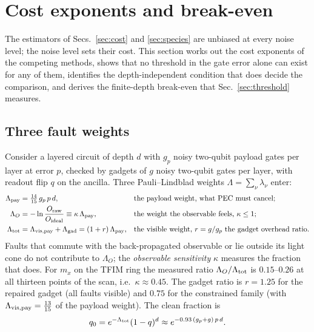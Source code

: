 \documentclass[11pt,a4paper]{article}
\theoremstyle{remark}
\begin{document}
\section{Cost exponents and break-even}
\label{sec:breakeven}

The estimators of Secs.~\ref{sec:cost} and \ref{sec:species} are unbiased at every noise level; the noise level sets their cost. This section works out the cost exponents of the competing methods, shows that no threshold in the gate error alone can exist for any of them, identifies the depth-independent condition that does decide the comparison, and derives the finite-depth break-even that Sec.~\ref{sec:threshold} measures.

\subsection{Three fault weights}

Consider a layered circuit of depth $d$ with $g_p$ noisy two-qubit payload gates per layer at error $p$, checked by gadgets of $g$ noisy two-qubit gates per layer, with readout flip $q$ on the ancilla. Three Pauli--Lindblad weights $\Lambda=\sum_\nu\lambda_\nu$ enter:
\begin{align}
\Lambda_{\rm pay}&=\tfrac{14}{15}\,g_p\,p\,d, &&\text{the payload weight, what PEC must cancel;}\nonumber\\
\Lambda_O&=-\ln\frac{O_{\rm raw}}{O_{\rm ideal}}\equiv\kappa\,\Lambda_{\rm pay}, &&\text{the weight the observable feels, }\kappa\le1;\label{eq:kappa}\\
\Lambda_{\rm tot}&=\Lambda_{\rm vis,pay}+\Lambda_{\rm gad}=(1+r)\,\Lambda_{\rm pay}, &&\text{the visible weight, }r=g/g_p\text{ the gadget overhead ratio.}\nonumber
\end{align}
Faults that commute with the back-propagated observable or lie outside its light cone do not contribute to $\Lambda_O$; the \emph{observable sensitivity} $\kappa$ measures the fraction that does. For $m_x$ on the TFIM ring the measured ratio $\Lambda_O/\Lambda_{\rm tot}$ is $0.15$--$0.26$ at all thirteen points of the scan, i.e.\ $\kappa\approx0.45$. The gadget ratio is $r=1.25$ for the repaired gadget (all faults visible) and $0.75$ for the constrained family (with $\Lambda_{\rm vis,pay}=\tfrac{13}{15}$ of the payload weight). The clean fraction is
\begin{equation}
q_0=e^{-\Lambda_{\rm tot}}(1-q)^d\approx e^{-0.93\,(g_p+g)\,p\,d}.
\label{eq:q0}
\end{equation}
\end{document}
